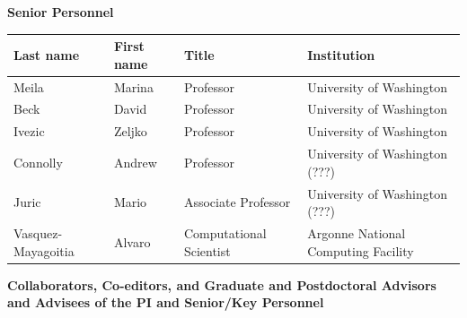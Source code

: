 \documentclass[floatfix,11pt]{article}
\begin{document}
\newpage
\centerline{\textbf{Senior Personnel}}
\begin{tabular}{llll}
  Last name & First name & Title & Institution\\
  \hline
Meila & Marina & Professor & University of Washington\\
Beck & David & Professor &  University of Washington\\
Ivezic & Zeljko & Professor &  University of Washington \\
Connolly & Andrew & Professor &  University of Washington (???)\\
Juric & Mario & Associate Professor &  University of Washington (???)\\
Vasquez-Mayagoitia & Alvaro & Computational Scientist & Argonne National Computing Facility\\
\end{tabular}

\centerline{\textbf{Collaborators, Co-editors, and Graduate and Postdoctoral Advisors and Advisees of the PI and Senior/Key Personnel}}
\begin{tabular}{llll}

\end{tabular}
\end{document}
